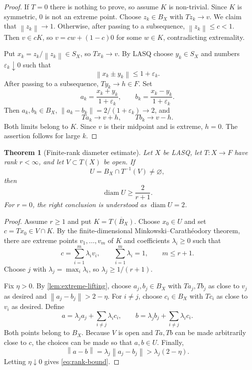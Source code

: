 \documentclass[11pt]{article}
\newtheorem{theorem}{Theorem}[section]
\newcommand{\eps}{\varepsilon}
\newcommand{\diam}{\operatorname{diam}}
\newcommand{\norm}[1]{\left\lVert #1\right\rVert}
\begin{document}
\begin{proof}
If $T=0$ there is nothing to prove, so assume $K$ is non-trivial.  Since $K$ is symmetric, $0$ is not an extreme point.  Choose $z_k\in B_X$ with $Tz_k\to v$.  We claim that $\norm{z_k}\to1$.  Otherwise, after passing to a subsequence, $\norm{z_k}\le c<1$.  Then $v\in cK$, so $v=cw+(1-c)0$ for some $w\in K$, contradicting extremality.

Put $x_k=z_k/\norm{z_k}\in S_X$, so $Tx_k\to v$.  By LASQ choose $y_k\in S_X$ and numbers $\eps_k\downarrow0$ such that
\[
 \norm{x_k\pm y_k}\le1+\eps_k.
\]
After passing to a subsequence, $Ty_k\to h\in F$.  Set
\[
 a_k=\frac{x_k+y_k}{1+\eps_k},
 \qquad
 b_k=\frac{x_k-y_k}{1+\eps_k}.
\]
Then $a_k,b_k\in B_X$, $\norm{a_k-b_k}=2/(1+\eps_k)\to2$, and
\[
 Ta_k\to v+h,
 \qquad
 Tb_k\to v-h.
\]
Both limits belong to $K$.  Since $v$ is their midpoint and is extreme, $h=0$.  The assertion follows for large $k$.
\end{proof}

\begin{theorem}[Finite-rank diameter estimate]
\label{thm:finite-rank}
Let $X$ be LASQ, let $T:X\to F$ have rank $r<\infty$, and let $V\subset T(X)$ be open.  If
\[
 U=B_X\cap T^{-1}(V)\ne\varnothing,
\]
then
\begin{equation}
\label{eq:rank-bound}
 \diam U\ge\frac{2}{r+1}.
\end{equation}
For $r=0$, the right conclusion is understood as $\diam U=2$.
\end{theorem}

\begin{proof}
Assume $r\ge1$ and put $K=\overline{T(B_X)}$.  Choose $x_0\in U$ and set $c=Tx_0\in V\cap K$.  By the finite-dimensional Minkowski--Carath\'eodory theorem, there are extreme points $v_1,\dots,v_m$ of $K$ and coefficients $\lambda_i\ge0$ such that
\[
 c=\sum_{i=1}^m\lambda_i v_i,
 \qquad
 \sum_{i=1}^m\lambda_i=1,
 \qquad
 m\le r+1.
\]
Choose $j$ with $\lambda_j=\max_i\lambda_i$, so $\lambda_j\ge1/(r+1)$.

Fix $\eta>0$.  By \cref{lem:extreme-lifting}, choose $a_j,b_j\in B_X$ with $Ta_j,Tb_j$ as close to $v_j$ as desired and $\norm{a_j-b_j}>2-\eta$.  For $i\ne j$, choose $c_i\in B_X$ with $Tc_i$ as close to $v_i$ as desired.  Define
\[
 a=\lambda_j a_j+\sum_{i\ne j}\lambda_i c_i,
 \qquad
 b=\lambda_j b_j+\sum_{i\ne j}\lambda_i c_i.
\]
Both points belong to $B_X$.  Because $V$ is open and $Ta,Tb$ can be made arbitrarily close to $c$, the choices can be made so that $a,b\in U$.  Finally,
\[
 \norm{a-b}=\lambda_j\norm{a_j-b_j}
 >\lambda_j(2-\eta).
\]
Letting $\eta\downarrow0$ gives \eqref{eq:rank-bound}.
\end{proof}
\end{document}
